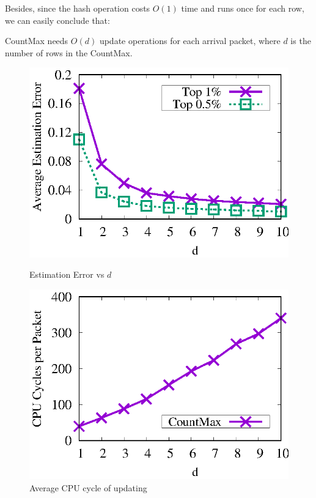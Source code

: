 Besides, since the hash operation costs $O(1)$ time and runs once for each row, we can easily conclude that:
\begin{theorem}\label{tm:time}
CountMax needs $O(d)$ update operations for each arrival packet, where $d$ is the number of rows in the CountMax.
\end{theorem}


\begin{figure}[!h]
	\centering
	\begin{minipage}[t]{0.48\linewidth}		
		\centering
		\includegraphics[width=\linewidth]{fig/cm_d_err.eps}
		\caption{Estimation Error vs $d$}
		\label{fig:cm,d,acc}
	\end{minipage}\vspace{-0.6em}
\hspace{0.4em}
	\begin{minipage}[t]{0.48\linewidth}
		\centering
		\includegraphics[width=\linewidth]{fig/cm_d_cpu.eps}
		\caption{Average CPU cycle of updating}
		\label{fig:cm,d,cpu}
	\end{minipage}\vspace{-0.6em}
\hspace{0.1em}
\end{figure}


